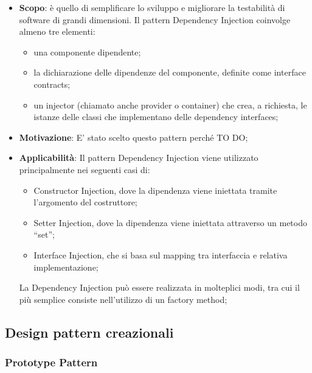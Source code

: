 		\begin{itemize}
			\item \textbf{Scopo}: è quello di semplificare lo sviluppo e migliorare la testabilità di software di grandi dimensioni.
Il pattern Dependency Injection coinvolge almeno tre elementi:

				\begin{itemize}
					\item una componente dipendente;
					\item la dichiarazione delle dipendenze del componente, definite come interface contracts;
					\item un injector (chiamato anche provider o container) che crea, a richiesta, le istanze delle classi che implementano delle dependency interfaces;
				\end{itemize}

			\item \textbf{Motivazione}: E' stato scelto questo pattern perché TO DO;

			\item \textbf{Applicabilità}: Il pattern Dependency Injection viene utilizzato principalmente nei seguenti casi di:
			\begin{itemize}
			\item Constructor Injection, dove la dipendenza viene iniettata tramite l’argomento del costruttore;
			\item Setter Injection, dove la dipendenza viene iniettata attraverso un metodo “set”;
			\item Interface Injection, che si basa sul mapping tra interfaccia e relativa implementazione;
			\end{itemize}
La Dependency Injection può essere realizzata in molteplici modi, tra cui il più semplice consiste nell'utilizzo di un factory method;

		\end{itemize}
		


	\clearpage
	\newpage
	\subsection{Design pattern creazionali} %
		\subsubsection{Prototype Pattern} %

